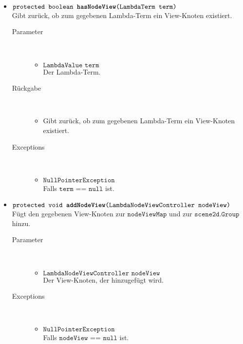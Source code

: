\begin{description}
\begin{itemize}
		\item $\texttt{protected boolean \textbf{hasNodeView}(LambdaTerm term)}$ \\ Gibt zurück, ob zum gegebenen Lambda-Term ein View-Knoten existiert.
		\begin{description}
			\item[Parameter] \hfill \\
			\vspace{-.8cm}
			\begin{itemize}
				\item $\texttt{LambdaValue term}$ \\ Der Lambda-Term.
			\end{itemize}
			\item[Rückgabe] \hfill \\
			\vspace{-.8cm}
			\begin{itemize}
				\item Gibt zurück, ob zum gegebenen Lambda-Term ein View-Knoten existiert.
			\end{itemize}
			\item[Exceptions] \hfill \\
			\vspace{-.8cm}
			\begin{itemize}
				\item $\texttt{NullPointerException}$ \\ Falls $\texttt{term == null}$ ist.
			\end{itemize}
		\end{description}
		
		\item $\texttt{protected void \textbf{addNodeView}(LambdaNodeViewController nodeView)}$ \\ Fügt den gegebenen View-Knoten zur $\texttt{nodeViewMap}$ und zur $\texttt{scene2d.Group}$ hinzu.
		\begin{description}
			\item[Parameter] \hfill \\
			\vspace{-.8cm}
			\begin{itemize}
				\item $\texttt{LambdaNodeViewController nodeView}$ \\ Der View-Knoten, der hinzugefügt wird.
			\end{itemize}
			\item[Exceptions] \hfill \\
			\vspace{-.8cm}
			\begin{itemize}
				\item $\texttt{NullPointerException}$ \\ Falls $\texttt{nodeView == null}$ ist.
			\end{itemize}
		\end{description}
		

\end{itemize}
\end{description}
